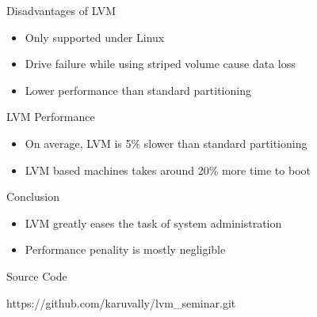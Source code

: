 \documentclass{beamer}
\begin{document}
\begin{frame}{Disadvantages of LVM}
    \begin{itemize}
        \item<2-> Only supported under Linux
        \item<3-> Drive failure while using striped volume cause data loss
        \item<5-> Lower performance than standard partitioning
    \end{itemize}
\end{frame}

\begin{frame}{LVM Performance}
    \begin{itemize}
        \item<2-> On average, LVM is 5\% slower than standard partitioning
        \item<3-> LVM based machines takes around 20\% more time to boot
    \end{itemize}
\end{frame}

\begin{frame}{Conclusion}
    \begin{itemize}
        \item<2-> LVM greatly eases the task of system administration
        \item<3-> Performance penality is mostly negligible
    \end{itemize}
\end{frame}

\begin{frame}{Source Code} 
    \begin{center}
        \large https://github.com/karuvally/lvm\_seminar.git
    \end{center}
\end{frame}
\end{document}
